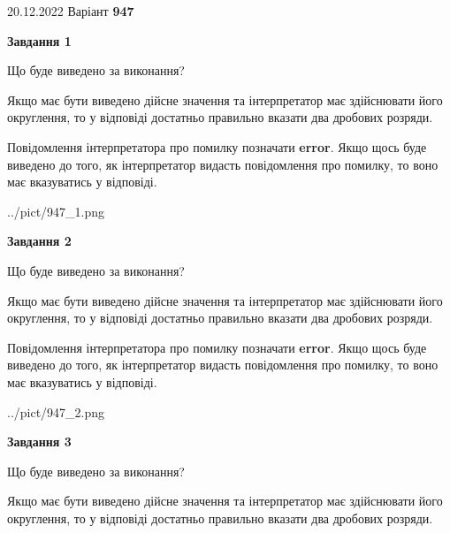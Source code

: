 \documentclass[12pt, ukrainian]{article}
\begin{document}
{20.12.2022 Варіант \No \textbf { 947 }\par}
{
\begin {Large}

{\begin {center}\textbf{Завдання 1}\end {center}}\par
Що буде виведено за виконання? \par

Якщо має бути виведено дійсне значення та інтерпретатор має здійснювати його округлення, 
то у відповіді достатньо правильно вказати два дробових розряди.

Повідомлення інтерпретатора про помилку позначати \textbf{error}.
Якщо щось буде виведено до того, як інтерпретатор видасть повідомлення про помилку, 
то воно має вказуватись у відповіді. \par

\begin{center}
	{../pict/947_1.png}
\end{center}
\newpage

{\begin {center}\textbf{Завдання 2}\end {center}}\par
Що буде виведено за виконання? \par

Якщо має бути виведено дійсне значення та інтерпретатор має здійснювати його округлення, 
то у відповіді достатньо правильно вказати два дробових розряди.

Повідомлення інтерпретатора про помилку позначати \textbf{error}.
Якщо щось буде виведено до того, як інтерпретатор видасть повідомлення про помилку, 
то воно має вказуватись у відповіді. \par

\begin{center}
	{../pict/947_2.png}
\end{center}
\newpage

{\begin {center}\textbf{Завдання 3}\end {center}}\par
Що буде виведено за виконання? \par

Якщо має бути виведено дійсне значення та інтерпретатор має здійснювати його округлення, 
то у відповіді достатньо правильно вказати два дробових розряди.


\end{Large}}
\end{document}
